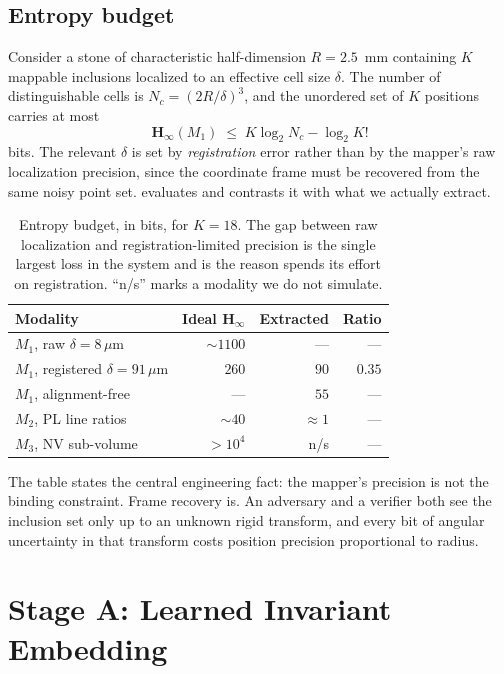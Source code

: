 \documentclass[10pt,twocolumn]{article}
\theoremstyle{remark}
\newcommand{\hinf}{\mathbf{H}_\infty}
\begin{document}
\subsection{Entropy budget}

Consider a stone of characteristic half-dimension $R = 2.5$~mm containing $K$
mappable inclusions localized to an effective cell size $\delta$. The number of
distinguishable cells is $N_c = (2R/\delta)^3$, and the unordered set of $K$
positions carries at most
\begin{equation}
\hinf(M_1) \;\leq\; K \log_2 N_c - \log_2 K!
\label{eq:budget}
\end{equation}
bits. The relevant $\delta$ is set by \emph{registration} error rather than by
the mapper's raw localization precision, since the coordinate frame must be
recovered from the same noisy point set.  evaluates
 and contrasts it with what we actually extract.

\begin{table}[t]
\centering
\small
\setlength{\tabcolsep}{4pt}
\renewcommand{\arraystretch}{1.15}
\begin{tabular}{lrrr}
\toprule
Modality & Ideal $\hinf$ & Extracted & Ratio \\
\midrule
$M_1$, raw $\delta{=}8\,\mu$m & $\sim\!\!1100$ & --- & --- \\
$M_1$, registered $\delta{=}91\,\mu$m & $260$ & $90$ & $0.35$ \\
$M_1$, alignment-free & --- & $55$ & --- \\
$M_2$, PL line ratios & $\sim\!\!40$ & $\approx\!1$ & --- \\
$M_3$, NV sub-volume & $>\!10^4$ & n/s & --- \\
\bottomrule
\end{tabular}
\caption{Entropy budget, in bits, for $K=18$. The gap between raw localization
and registration-limited precision is the single largest loss in the system and
is the reason  spends its effort on registration. ``n/s'' marks a modality we do not simulate.}
\label{tab:entropy}
\end{table}

The table states the central engineering fact: the mapper's precision is not the
binding constraint. Frame recovery is. An adversary and a verifier both see the
inclusion set only up to an unknown rigid transform, and every bit of angular
uncertainty in that transform costs position precision proportional to radius.

\section{Stage A: Learned Invariant Embedding}
\label{sec:stageA}
\end{document}
